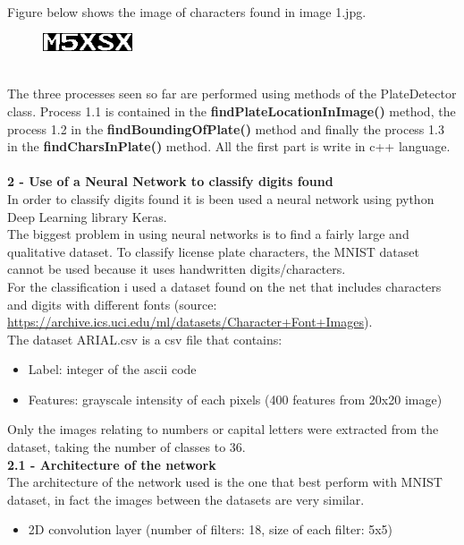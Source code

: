 \documentclass[11pt]{article}
\begin{document}
\begin{titlepage}
{\\Figure below shows the image of characters found in image 1.jpg.
\begin{figure}[htbp]
\centering
\includegraphics[totalheight=0.11\textwidth]{plate1.jpg}
\end{figure}
\\ The three processes seen so far are performed using methods of the PlateDetector class. Process 1.1 is contained in the \textbf{findPlateLocationInImage()} method, the process 1.2 in the \textbf{findBoundingOfPlate()} method and finally the process 1.3 in the \textbf{findCharsInPlate()} method. All the first part is write in c++ language.\\
\\\textbf{\large{2 - Use of a Neural Network to classify digits found}}\\
[1 mm]
In order to classify digits found it is been used a neural network using python Deep Learning library Keras. 
\\ The biggest problem in using neural networks is to find a fairly large and qualitative dataset. To classify license plate characters, the MNIST dataset cannot be used because it uses handwritten digits/characters.
\\ For the classification i used a dataset found on the net that includes characters and digits with different fonts (source: \href{https://archive.ics.uci.edu/ml/datasets/Character+Font+Images}{https://archive.ics.uci.edu/ml/datasets/Character+Font+Images}).
\\The dataset ARIAL.csv is a csv file that contains:
\begin{itemize}
\item Label: integer of the ascii code
\item Features: grayscale intensity of each pixels (400 features from 20x20 image)
\end{itemize}
Only the images relating to numbers or capital letters were extracted from the dataset, taking the number of classes to 36.
\\[1.5 mm]
\textbf{\large{2.1 - Architecture of the network}}
\\[1 mm]
The architecture of the network used is the one that best perform with MNIST dataset, in fact the images between the datasets are very similar.
\begin{itemize}
\item 2D convolution layer (number of filters: 18, size of each filter: 5x5)

\end{itemize}}
\end{titlepage}
\end{document}
